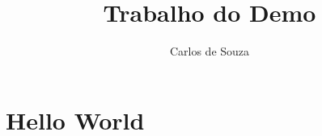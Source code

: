 \documentclass[artigo, 12pt]{artigo}
\title{Trabalho do Demo}
\author{Carlos de Souza}
\begin{document}
    \chapter{Hello World}
\end{document}
